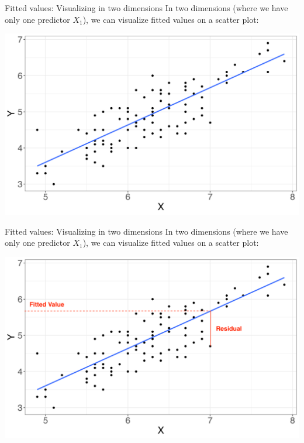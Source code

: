 \documentclass[10pt,t]{beamer}
\begin{document}
\begin{frame}{Fitted values: Visualizing in two dimensions}
In two dimensions (where we have only one predictor $X_1$), we can visualize fitted values on a scatter plot:
\vspace{0.3cm}

\centering \includegraphics[scale=0.4]{fitted_vals1.png}
\end{frame}

\begin{frame}{Fitted values: Visualizing in two dimensions}
In two dimensions (where we have only one predictor $X_1$), we can visualize fitted values on a scatter plot:
\vspace{0.3cm}

\centering \includegraphics[scale=0.4]{fitted_vals2.png}
\end{frame}
\end{document}
